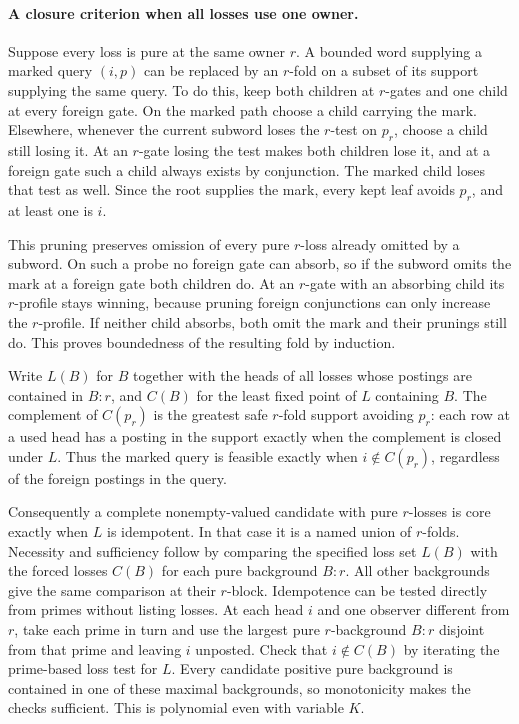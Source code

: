 \paragraph{A closure criterion when all losses use one owner.}
Suppose every loss is pure at the same owner $r$. A bounded
word supplying a marked query $(i,p)$ can be replaced by an
$r$-fold on a subset of its support supplying the same query.
To do this, keep both children at $r$-gates and one child
at every foreign gate. On the marked path choose a child
carrying the mark. Elsewhere, whenever the current subword
loses the $r$-test on $p_r$, choose a child still losing it.
At an $r$-gate losing the test makes both children lose it,
and at a foreign gate such a child always exists by
conjunction. The marked child loses that test as well.
Since the root supplies the mark, every kept leaf avoids
$p_r$, and at least one is $i$.

This pruning preserves omission of every pure $r$-loss
already omitted by a subword. On such a probe no foreign
gate can absorb, so if the subword omits the mark at a
foreign gate both children do. At an $r$-gate with an
absorbing child its $r$-profile stays winning, because
pruning foreign conjunctions can only increase the
$r$-profile. If neither child absorbs, both omit the mark
and their prunings still do. This proves boundedness of
the resulting fold by induction.

Write $L(B)$ for $B$ together with the heads of all losses
whose postings are contained in $B:r$, and $C(B)$ for the
least fixed point of $L$ containing $B$. The complement of
$C(p_r)$ is the greatest safe $r$-fold support avoiding
$p_r$: each row at a used head has a posting in the support
exactly when the complement is closed under $L$. Thus the
marked query is feasible exactly when $i\notin C(p_r)$,
regardless of the foreign postings in the query.

Consequently a complete nonempty-valued candidate with
pure $r$-losses is core exactly when $L$ is idempotent.
In that case it is a named union of $r$-folds. Necessity
and sufficiency follow by comparing the specified loss
set $L(B)$ with the forced losses $C(B)$ for each pure
background $B:r$. All other backgrounds give the same
comparison at their $r$-block.
Idempotence can be tested directly from primes without
listing losses. At each head $i$ and one observer
different from $r$, take each prime in turn and use
the largest pure $r$-background $B:r$ disjoint from that
prime and leaving $i$ unposted. Check that $i\notin C(B)$
by iterating the prime-based loss test for $L$. Every
candidate positive pure background is contained in one
of these maximal backgrounds, so monotonicity makes the
checks sufficient. This is polynomial even with variable
$K$.

